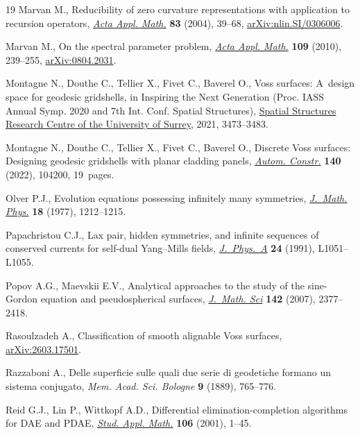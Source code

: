 \documentclass[pdftex]{sigma}
\numberwithin{equation}{section}
\theoremstyle{definition}
\begin{document}
\begin{thebibliography}{19}
Marvan M., Reducibility of zero curvature representations with application to
 recursion operators,
 \href{https://doi.org/10.1023/B:ACAP.0000035588.67805.0b}{\textit{Acta Appl.
 Math.}} \textbf{83} (2004), 39--68,
 \href{http://arxiv.org/abs/nlin.SI/0306006}{arXiv:nlin.SI/0306006}.

Marvan M., On the spectral parameter problem,
 \href{https://doi.org/10.1007/s10440-009-9450-4}{\textit{Acta Appl. Math.}}
 \textbf{109} (2010), 239--255,
 \href{http://arxiv.org/abs/0804.2031}{arXiv:0804.2031}.

Montagne N., Douthe C., Tellier X., Fivet C., Baverel O., Voss surfaces: A~design space for geodesic gridshells, in Inspiring the {N}ext {G}eneration
 (Proc. IASS Annual Symp. 2020 and 7th Int. Conf. Spatial Structures),
 \href{https://doi.org/10.15126/900337}{Spatial Structures Research Centre of
 the University of Surrey}, 2021, 3473--3483.

Montagne N., Douthe C., Tellier X., Fivet C., Baverel O., Discrete {V}oss
 surfaces: {D}esigning geodesic gridshells with planar cladding panels,
 \href{https://doi.org/10.1016/j.autcon.2022.104200}{\textit{Autom. Constr.}}
 \textbf{140} (2022), 104200, 19~pages.

Olver P.J., Evolution equations possessing infinitely many symmetries,
 \href{https://doi.org/10.1063/1.523393}{\textit{J.~Math. Phys.}} \textbf{18}
 (1977), 1212--1215.

Papachristou C.J., Lax pair, hidden symmetries, and infinite sequences of
 conserved currents for self-dual {Y}ang--{M}ills fields,
 \href{https://doi.org/10.1088/0305-4470/24/17/015}{\textit{J.~Phys.~A}}
 \textbf{24} (1991), L1051--L1055.

Popov A.G., Maevskii E.V., Analytical approaches to the study of the
 sine-{G}ordon equation and pseudospherical surfaces,
 \href{https://doi.org/10.1007/s10958-007-0183-5}{\textit{J.~Math. Sci}}
 \textbf{142} (2007), 2377--2418.

Rasoulzadeh A., Classification of smooth alignable {V}oss surfaces,
 \href{http://arxiv.org/abs/2603.17501}{arXiv:2603.17501}.

Razzaboni A., Delle superficie sulle quali due serie di geodetiche formano un
 sistema conjugato, \textit{Mem. Acad. Sci. Bologne} \textbf{9} (1889),
 765--776.

Reid G.J., Lin P., Wittkopf A.D., Differential elimination-completion
 algorithms for {DAE} and {PDAE},
 \href{https://doi.org/10.1111/1467-9590.00159}{\textit{Stud. Appl. Math.}}
 \textbf{106} (2001), 1--45.


\end{thebibliography}
\end{document}
